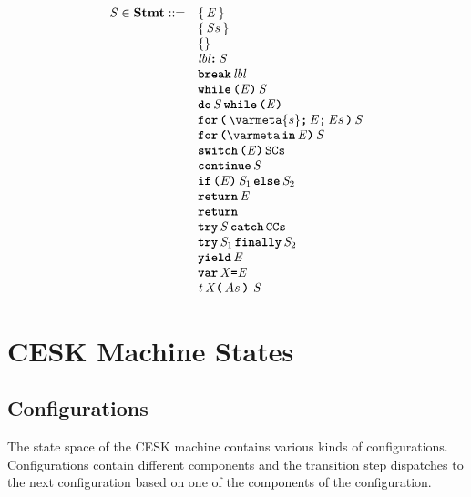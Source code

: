 \documentclass[a4paper,oneside,fleqn]{article}
\newcommand{\dstmt}{\mathbf{Stmt}}
\newcommand{\idmeta}{\ensuremath{\mathit{X}}}
\newcommand{\typemeta}{\ensuremath{\mathit{t}}}
\begin{document}
\[
\begin{array}{rl}

  \statementmeta \in \dstmt ::=
  & \ExpressionStatement{\expressionmeta} \\
  & \Block{\statementmeta{s}} \\
  & \EmptyStatement \\
  & \LabeledStatement{\lbl}{\statementmeta} \\
  & \BreakStatement{\lbl} \\
  & \WhileStatement{\expressionmeta}{\statementmeta} \\
  & \DoStatement{\statementmeta}{\expressionmeta} \\
  & \ForStatement{\varmeta{s}}{\expressionmeta}{\expressionsmeta}{\statementmeta} \\
  & \ForInStatement{\varmeta}{\expressionmeta}{\statementmeta} \\
  & \SwitchStatement{\expressionmeta}{\tt{SCs}} \\
  & \ContinueSwitchStatement{\statementmeta} \\
  & \IfStatement{\expressionmeta}{\statementmeta_1}{\statementmeta_2} \\
  & \ReturnStatement{\expressionmeta} \\
  & \ReturnStatement{} \\
  & \TryCatch{\statementmeta}{\tt{CCs}} \\
  & \TryFinally{\statementmeta_1}{\statementmeta_2} \\
  & \Yield{\expressionmeta} \\
  & \VarDeclaration{\idmeta}{\expressionmeta} \\
  & \FunctionDeclaration{\typemeta}{\idmeta}{\formals}{}{\stmt} \\

\end{array}
\]

\section{CESK Machine States}
\subsection{Configurations}
\label{subsec:cesk-configs}

The state space of the CESK machine contains various kinds of configurations.
Configurations contain different components and the transition step dispatches to the next configuration based on one of the components of the configuration.
\end{document}
